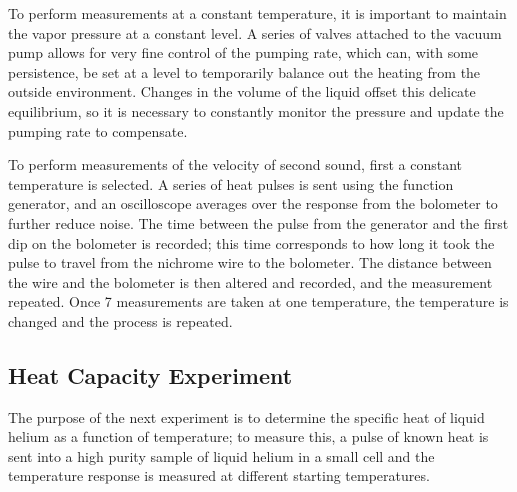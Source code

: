 To perform measurements at a constant temperature, it is important to maintain the vapor pressure at a constant level. A series of valves attached to the vacuum pump allows for very fine control of the pumping rate, which can, with some persistence, be set at a level to temporarily balance out the heating from the outside environment. Changes in the volume of the liquid offset this delicate equilibrium, so it is necessary to constantly monitor the pressure and update the pumping rate to compensate.

To perform measurements of the velocity of second sound, first a constant temperature is selected. A series of heat pulses is sent using the function generator, and an oscilloscope averages over the response from the bolometer to further reduce noise. The time between the pulse from the generator and the first dip on the bolometer is recorded; this time corresponds to how long it took the pulse to travel from the nichrome wire to the bolometer. The distance between the wire and the bolometer is then altered and recorded, and the measurement repeated. Once 7 measurements are taken at one temperature, the temperature is changed and the process is repeated.

\subsection{Heat Capacity Experiment}\label{heatcapacityexperiment}

The purpose of the next experiment is to determine the specific heat of liquid helium as a function of temperature; to measure this, a pulse of known heat is sent into a high purity sample of liquid helium in a small cell and the temperature response is measured at different starting temperatures.

